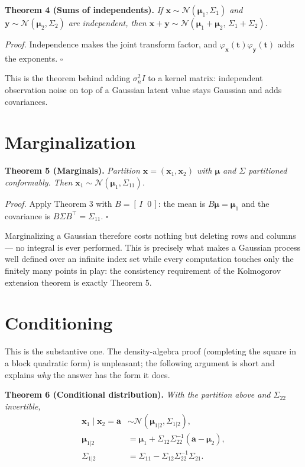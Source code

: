 \documentclass[conference]{IEEEtran}
\begin{document}
\medskip
\noindent\textbf{Theorem 4 (Sums of independents).}
\textit{If $\mathbf{x} \sim \mathcal{N}(\boldsymbol{\mu}_1,\Sigma_1)$ and $\mathbf{y} \sim \mathcal{N}(\boldsymbol{\mu}_2,\Sigma_2)$ are independent, then $\mathbf{x}+\mathbf{y} \sim \mathcal{N}(\boldsymbol{\mu}_1+\boldsymbol{\mu}_2,\, \Sigma_1+\Sigma_2)$.}

\medskip
\textit{Proof.} Independence makes the joint transform factor, and $\varphi_{\mathbf{x}}(\mathbf{t})\varphi_{\mathbf{y}}(\mathbf{t})$ adds the exponents. $\square$

\medskip
This is the theorem behind adding $\sigma_n^2 I$ to a kernel matrix: independent observation noise on top of a Gaussian latent value stays Gaussian and adds covariances.

\section*{Marginalization}
\noindent\textbf{Theorem 5 (Marginals).}
\textit{Partition $\mathbf{x} = (\mathbf{x}_1, \mathbf{x}_2)$ with $\boldsymbol{\mu}$ and $\Sigma$ partitioned conformably. Then $\mathbf{x}_1 \sim \mathcal{N}(\boldsymbol{\mu}_1, \Sigma_{11})$.}

\medskip
\textit{Proof.} Apply Theorem 3 with $B = [\,I \;\; 0\,]$: the mean is $B\boldsymbol{\mu} = \boldsymbol{\mu}_1$ and the covariance is $B\Sigma B^{\!\top} = \Sigma_{11}$. $\square$

\medskip
Marginalizing a Gaussian therefore costs nothing but deleting rows and columns --- no integral is ever performed. This is precisely what makes a Gaussian process well defined over an infinite index set while every computation touches only the finitely many points in play: the consistency requirement of the Kolmogorov extension theorem is exactly Theorem 5.

\section*{Conditioning}
This is the substantive one. The density-algebra proof (completing the square in a block quadratic form) is unpleasant; the following argument is short and explains \textit{why} the answer has the form it does.

\medskip
\noindent\textbf{Theorem 6 (Conditional distribution).}
\textit{With the partition above and $\Sigma_{22}$ invertible,}
\begin{align}
    \mathbf{x}_1 \mid \mathbf{x}_2 = \mathbf{a} &\sim \mathcal{N}\!\left(\boldsymbol{\mu}_{1|2}, \Sigma_{1|2}\right), \\
    \boldsymbol{\mu}_{1|2} &= \boldsymbol{\mu}_1 + \Sigma_{12}\Sigma_{22}^{-1}(\mathbf{a} - \boldsymbol{\mu}_2), \\
    \Sigma_{1|2} &= \Sigma_{11} - \Sigma_{12}\Sigma_{22}^{-1}\Sigma_{21}.
\end{align}
\end{document}
